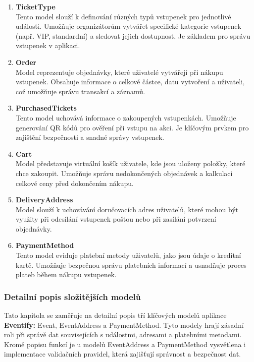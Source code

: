 \documentclass[12pt, a4paper,
twoside,        %
openright
]{report}
\begin{document}
\begin{enumerate}
	\item \textbf{TicketType}\\
	Tento model slouží k definování různých typů vstupenek pro jednotlivé události. Umožňuje organizátorům vytvářet specifické kategorie vstupenek (např. VIP, standardní) a sledovat jejich dostupnost. Je základem pro správu vstupenek v aplikaci.
	
	\item \textbf{Order}\\
	Model reprezentuje objednávky, které uživatelé vytvářejí při nákupu vstupenek. Obsahuje informace o celkové částce, datu vytvoření a uživateli, což umožňuje správu transakcí a záznamů.
	
	\item \textbf{PurchasedTickets}\\
	Tento model uchovává informace o zakoupených vstupenkách. Umožňuje generování QR kódů pro ověření při vstupu na akci. Je klíčovým prvkem pro zajištění bezpečnosti a snadné správy vstupenek.
	
	\item \textbf{Cart}\\
	Model představuje virtuální košík uživatele, kde jsou uloženy položky, které chce zakoupit. Umožňuje správu nedokončených objednávek a kalkulaci celkové ceny před dokončením nákupu.
	
	\item \textbf{DeliveryAddress}\\
	Model slouží k uchovávání doručovacích adres uživatelů, které mohou být využity při odesílání vstupenek poštou nebo při zasílání potvrzení objednávky.
	
	\item \textbf{PaymentMethod}\\
	Tento model eviduje platební metody uživatelů, jako jsou údaje o kreditní kartě. Umožňuje bezpečnou správu platebních informací a usnadňuje proces plateb během nákupu vstupenek.
	
	\end{enumerate}
\clearpage
\subsubsection{Detailní popis složitějších modelů}

Tato kapitola se zaměřuje na detailní popis tří klíčových modelů aplikace \textbf{Eventify:} Event, EventAddress a PaymentMethod. Tyto modely hrají zásadní roli při správě dat souvisejících s událostmi, adresami a platebními metodami. Kromě popisu funkcí je u modelů EventAddress a PaymentMethod vysvětlena i implementace validačních pravidel, která zajišťují správnost a bezpečnost dat.
\end{document}
